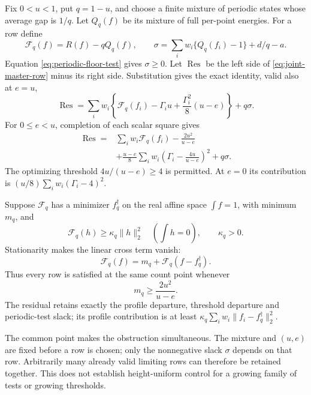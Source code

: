 \documentclass[11pt,reqno]{amsart}
\numberwithin{equation}{section}
\begin{document}
Fix $0<u<1$, put $q=1-u$, and choose a finite mixture of periodic
states whose average gap is $1/q$. Let $Q_q(f)$ be its mixture
of full per-point energies. For a row define
\begin{equation}
 \mathcal F_q(f)=R(f)-qQ_q(f),\qquad
 \sigma=\sum_iw_i\{Q_q(f_i)-1\}+d/q-a.
 \label{eq:periodic-slack}
\end{equation}
Equation \eqref{eq:periodic-floor-test} gives $\sigma\ge0$.
Let $\operatorname{Res}$ be the left side of
\eqref{eq:joint-master-row} minus its right side. Substitution gives
the exact identity, valid also at $e=u$,
\begin{equation}
 \operatorname{Res}
 =\sum_iw_i\left\{\mathcal F_q(f_i)-\Gamma_i u
                    +\frac{\Gamma_i^2}{8}(u-e)\right\}+q\sigma.
 \label{eq:residual-uncompleted}
\end{equation}
For $0\le e<u$, completion of each scalar square gives
\begin{equation}
 \begin{split}
 \operatorname{Res}={}&
 \sum_iw_i\mathcal F_q(f_i)-\frac{2u^2}{u-e}\\
 &+\frac{u-e}{8}\sum_iw_i
       \left(\Gamma_i-\frac{4u}{u-e}\right)^2+q\sigma.
 \end{split}
 \label{eq:general-periodic-residual}
\end{equation}
The optimizing threshold $4u/(u-e)\ge4$ is permitted.
At $e=0$ its contribution is $(u/8)\sum_iw_i(\Gamma_i-4)^2$.

Suppose $\mathcal F_q$ has a minimizer $f_q^\dagger$
on the real affine space $\int f=1$, with minimum $m_q$, and
\[
 \mathcal F_q(h)\ge\kappa_q\|h\|_2^2
 \quad\left(\int h=0\right),\qquad\kappa_q>0.
\]
Stationarity makes the linear cross term vanish:
\begin{equation}
 \mathcal F_q(f)=m_q+\mathcal F_q(f-f_q^\dagger).
 \label{eq:general-variational-defect}
\end{equation}
Thus every row is satisfied at the same count point whenever
\begin{equation}
 m_q\ge\frac{2u^2}{u-e}.
 \label{eq:general-count-frontier}
\end{equation}
The residual retains exactly the profile departure, threshold
departure and periodic-test slack; its profile contribution is at
least $\kappa_q\sum_iw_i\|f_i-f_q^\dagger\|_2^2$.

The common point makes the obstruction simultaneous.
The mixture and $(u,e)$ are fixed before a row is chosen; only
the nonnegative slack $\sigma$ depends on that row.
Arbitrarily many already valid limiting rows can therefore be
retained together. This does not establish height-uniform control
for a growing family of tests or growing thresholds.
\end{document}
